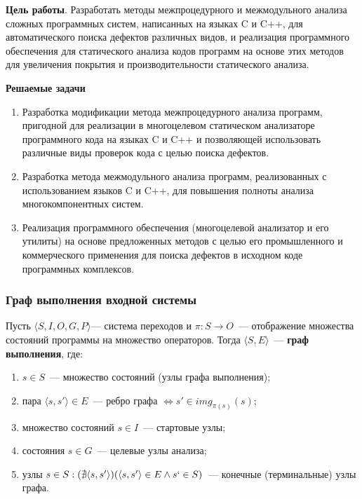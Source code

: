 \documentclass[10pt,gray]{beamer}
\begin{document}
\begin{frame}
\textbf{\Large{Цель работы}}. Разработать методы межпроцедурного и межмодульного анализа сложных программных систем, написанных на языках C и C++, для автоматического поиска дефектов различных видов, и реализация программного обеспечения для статического анализа кодов программ на основе этих методов для увеличения покрытия и производительности статического анализа.

\vspace{5pt}
\textbf{\Large{Решаемые задачи}}

\begin{enumerate}
  \item Разработка модификации метода межпроцедурного анализа программ, пригодной для реализации в многоцелевом статическом анализаторе программного кода на языках C и C++ и позволяющей использовать различные виды проверок кода с целью поиска дефектов.
  \item Разработка метода межмодульного анализа программ, реализованных с использованием языков C и C++, для повышения полноты анализа многокомпонентных систем.
  \item Реализация программного обеспечения (многоцелевой анализатор и его утилиты) на основе предложенных методов с целью его промышленного и коммерческого применения для поиска дефектов в исходном коде программных комплексов.
\end{enumerate}

\end{frame}

\begin{frame}
\frametitle{Граф выполнения входной системы}
Пусть $\langle S, I, O, G, P\rangle$--- система переходов и $\pi: S \rightarrow O$~--- отображение множества состояний программы на множество операторов. Тогда $\langle S, E\rangle $~--- \textbf{граф выполнения}, где:
\begin{enumerate}
 \item $s \in S$~--- множество состояний (узлы графа выполнения);
 \item пара $\langle s, s'\rangle \in E$~--- ребро графа $\Leftrightarrow s' \in img_{\pi(s)}(s)$;
 \item множество состояний $s \in I$~--- стартовые узлы;
 \item состояния $s \in G$~--- целевые узлы анализа;
 \item узлы $s \in S: (\nexists \langle s, s' \rangle )(\langle s, s' \rangle \in E \wedge s` \in S)$~--- конечные (терминальные) узлы графа.
\end{enumerate}
\end{frame}
\end{document}
